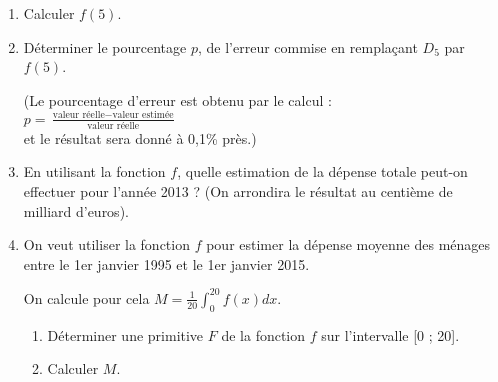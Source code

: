 \begin{enumerate}
     \item
     Calculer $f\left(5\right)$.
     \item
     Déterminer le pourcentage $p$, de l'erreur commise en remplaçant $D_{5}$ par $f\left(5\right)$.
     \par
     (Le pourcentage d'erreur est obtenu par le calcul : 
\\
$p=$\nosp$\frac{\text{valeur réelle} - \text{valeur estimée}}{\text{valeur réelle}}$	
\\
et le résultat
     sera donné à 0,1\% près.)
     \item
     En utilisant la fonction $f$, quelle estimation de la dépense totale peut-on effectuer pour l'année 2013 ? (On arrondira le résultat au centième de milliard d'euros).
     \item
     On veut utiliser la fonction $f$ pour estimer la dépense moyenne des ménages entre le 1er janvier 1995 et le 1er janvier 2015.
     \par
     On calcule pour cela $M=\frac{1}{20} \int_{0}^{20} f\left(x\right)dx$.
     \begin{enumerate}[label=\alph*.]
          \item
          Déterminer une primitive $F$ de la fonction $f$ sur l'intervalle [0 ; 20].
          \item
     Calculer $M$.\end{enumerate}
\end{enumerate}
